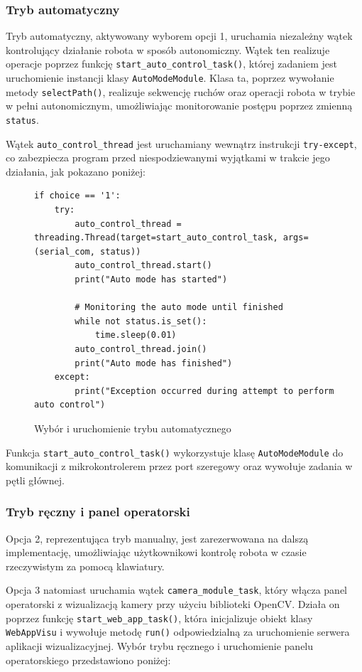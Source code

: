 \subsubsection{Tryb automatyczny}

Tryb automatyczny, aktywowany wyborem opcji 1, uruchamia niezależny wątek kontrolujący działanie robota w sposób autonomiczny. Wątek ten realizuje operacje poprzez funkcję \texttt{start\_auto\_control\_task()}, której zadaniem jest uruchomienie instancji klasy \texttt{AutoModeModule}. Klasa ta, poprzez wywołanie metody \texttt{selectPath()}, realizuje sekwencję ruchów oraz operacji robota w trybie w pełni autonomicznym, umożliwiając monitorowanie postępu poprzez zmienną \texttt{status}.

Wątek \texttt{auto\_control\_thread} jest uruchamiany wewnątrz instrukcji \texttt{try-except}, co zabezpiecza program przed niespodziewanymi wyjątkami w trakcie jego działania, jak pokazano poniżej:

\begin{figure}[H]
  \centering
  \begin{lstlisting}
if choice == '1':
    try:
        auto_control_thread = threading.Thread(target=start_auto_control_task, args=(serial_com, status))
        auto_control_thread.start()
        print("Auto mode has started")

        # Monitoring the auto mode until finished
        while not status.is_set():
            time.sleep(0.01)
        auto_control_thread.join()
        print("Auto mode has finished")
    except:
        print("Exception occurred during attempt to perform auto control")
  \end{lstlisting}
  \caption{Wybór i uruchomienie trybu automatycznego}
  \label{fig:automode_choice}
\end{figure}

Funkcja \texttt{start\_auto\_control\_task()} wykorzystuje klasę \texttt{AutoModeModule} do komunikacji z mikrokontrolerem przez port szeregowy oraz wywołuje zadania w pętli głównej.

\subsubsection{Tryb ręczny i panel operatorski}

Opcja 2, reprezentująca tryb manualny, jest zarezerwowana na dalszą implementację, umożliwiając użytkownikowi kontrolę robota w czasie rzeczywistym za pomocą klawiatury.

Opcja 3 natomiast uruchamia wątek \texttt{camera\_module\_task}, który włącza panel operatorski z wizualizacją kamery przy użyciu biblioteki OpenCV. Działa on poprzez funkcję \texttt{start\_web\_app\_task()}, która inicjalizuje obiekt klasy \texttt{WebAppVisu} i wywołuje metodę \texttt{run()} odpowiedzialną za uruchomienie serwera aplikacji wizualizacyjnej. Wybór trybu ręcznego i uruchomienie panelu operatorskiego przedstawiono poniżej:

